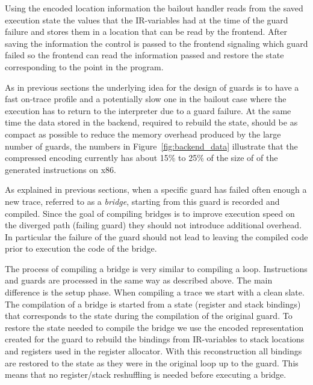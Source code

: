 \documentclass[10pt,preprint]{sigplanconf}
\begin{document}
Using the encoded location information the bailout handler reads from the
saved execution state the values that the IR-variables had  at the time of the
guard failure and stores them in a location that can be read by the frontend.
After saving the information the control is passed to the frontend signaling
which guard failed so the frontend can read the information passed and restore
the state corresponding to the point in the program.

As in previous sections the underlying idea for the design of guards is to have
a fast on-trace profile and a potentially slow one in the bailout case where
the execution has to return to the interpreter due to a guard failure. At the same
time the data stored in the backend, required to rebuild the state, should be as
compact as possible to reduce the memory overhead produced by the large number
of guards, the numbers in Figure~\ref{fig:backend_data} illustrate that the
compressed encoding currently has about 15\% to 25\% of the size of of the
generated instructions on x86.

As explained in previous sections, when a specific guard has failed often enough
a new trace, referred to as a \emph{bridge}, starting from this guard is recorded and
compiled.
Since the goal of compiling bridges is to improve execution speed on the
diverged path (failing guard) they should not introduce additional overhead.
In particular the failure of the guard should not lead
to leaving the compiled code prior to execution the code of the bridge.

The process of compiling a bridge is very similar to compiling a loop.
Instructions and guards are processed in the same way as described above. The
main difference is the setup phase. When compiling a trace we start with a clean
slate. The compilation of a bridge is started from a state (register and stack
bindings) that corresponds to the state during the compilation of the original
guard. To restore the state needed to compile the bridge we use the encoded
representation created for the guard to rebuild the bindings from IR-variables
to stack locations and registers used in the register allocator.  With this
reconstruction all bindings are restored to the state as they were in the
original loop up to the guard. This means that no register/stack reshuffling is
needed before executing a bridge.
\end{document}
